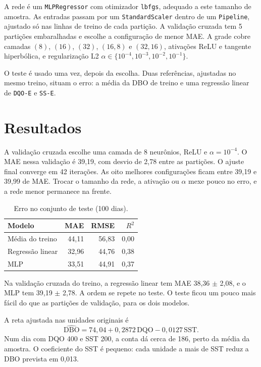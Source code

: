 \documentclass[11pt,a4paper]{article}
\begin{document}
A rede é um \texttt{MLPRegressor} com otimizador \texttt{lbfgs}, adequado a este tamanho de amostra. As entradas passam por um \texttt{StandardScaler} dentro de um \texttt{Pipeline}, ajustado só nas linhas de treino de cada partição. A validação cruzada tem 5 partições embaralhadas e escolhe a configuração de menor MAE. A grade cobre camadas \((8)\), \((16)\), \((32)\), \((16,8)\) e \((32,16)\), ativações ReLU e tangente hiperbólica, e regularização L2 \(\alpha \in \{10^{-4}, 10^{-3}, 10^{-2}, 10^{-1}\}\).

O teste é usado uma vez, depois da escolha. Duas referências, ajustadas no mesmo treino, situam o erro: a média da DBO de treino e uma regressão linear de \texttt{DQO-E} e \texttt{SS-E}.

\section{Resultados}

A validação cruzada escolhe uma camada de 8 neurônios, ReLU e \(\alpha = 10^{-4}\). O MAE nessa validação é 39,19, com desvio de 2,78 entre as partições. O ajuste final converge em 42 iterações. As oito melhores configurações ficam entre 39,19 e 39,99 de MAE. Trocar o tamanho da rede, a ativação ou \(\alpha\) mexe pouco no erro, e a rede menor permanece na frente.

\begin{table}[ht]
\centering
\caption{Erro no conjunto de teste (100 dias).}
\begin{tabular}{lrrr}
\toprule
Modelo & MAE & RMSE & \(R^{2}\) \\
\midrule
Média do treino & 44,11 & 56,83 & 0,00 \\
Regressão linear & 32,96 & 44,76 & 0,38 \\
MLP & 33,51 & 44,91 & 0,37 \\
\bottomrule
\end{tabular}
\end{table}

Na validação cruzada do treino, a regressão linear tem MAE 38,36 \(\pm\) 2,08, e o MLP tem 39,19 \(\pm\) 2,78. A ordem se repete no teste. O teste ficou um pouco mais fácil do que as partições de validação, para os dois modelos.

A reta ajustada nas unidades originais é
\begin{equation}
\widehat{\mathrm{DBO}} = 74{,}04 + 0{,}2872\,\mathrm{DQO} - 0{,}0127\,\mathrm{SST}.
\end{equation}
Num dia com DQO 400 e SST 200, a conta dá cerca de 186, perto da média da amostra. O coeficiente do SST é pequeno: cada unidade a mais de SST reduz a DBO prevista em 0,013.
\end{document}
